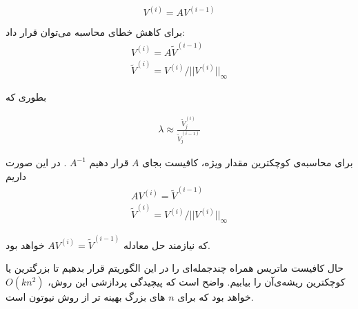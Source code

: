 \begin{equation}
  V^{(i)} = A V^{(i - 1)}
\end{equation}

برای کاهش خطای محاسبه می‌توان قرار داد:
\begin{equation}
  \begin{split}
    V^{(i)} = A \tilde{V}^{(i - 1)} \\
    \tilde{V}^{(i)} = V^{(i)} / || V^{(i)} ||_\infty
  \end{split}
\end{equation}

بطوری که


\begin{equation}
  \begin{split}
    \lambda \approx \frac{\tilde{V}_j^{(i)}}{\tilde{V}_j^{(i - 1)}}
  \end{split}
\end{equation}

برای محاسبه‌ی کوچکترین مقدار ویژه‌، کافیست بجای
$A$
قرار دهیم
$A^{-1}$
.
در این صورت
داریم
\begin{equation}
  \begin{split}
    A V^{(i)} = \tilde{V}^{(i - 1)} \\
    \tilde{V}^{(i)} = V^{(i)} / || V^{(i)} ||_\infty
  \end{split}
\end{equation}

که نیازمند حل معادله
$A V^{(i)} = \tilde{V}^{(i - 1)}$
خواهد بود.

حال کافیست ماتریس همراه چندجمله‌ای را در این الگوریتم قرار بدهیم تا بزرگترین یا کوچکترین ریشه‌ی‌آن را بیابیم.
واضح است که پیچیدگی پردازشی این روش،
$O(kn^2)$
خواهد بود که برای
$n$
های بزرگ بهینه تر از روش نیوتون است.
